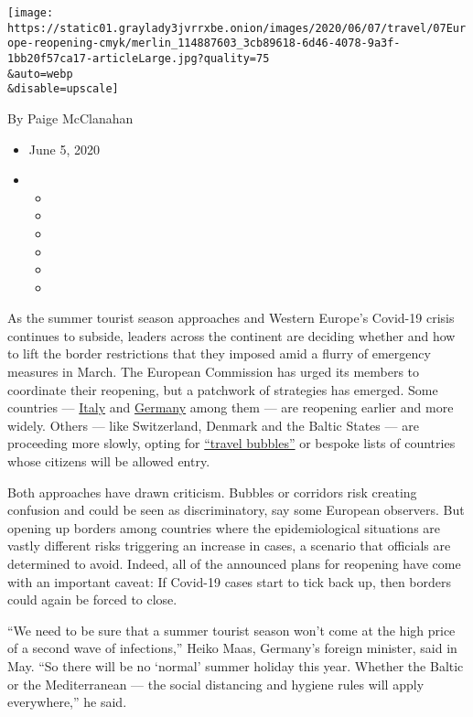 \texttt{[image: https://static01.graylady3jvrrxbe.onion/images/2020/06/07/travel/07Europe-reopening-cmyk/merlin\_114887603\_3cb89618-6d46-4078-9a3f-1bb20f57ca17-articleLarge.jpg?quality=75\\\&auto=webp\\\&disable=upscale]}

By Paige McClanahan

\begin{itemize}
\item
  June 5, 2020
\item
  \begin{itemize}
  \item
  \item
  \item
  \item
  \item
  \item
  \end{itemize}
\end{itemize}

As the summer tourist season approaches and Western Europe's Covid-19
crisis continues to subside, leaders across the continent are deciding
whether and how to lift the border restrictions that they imposed amid a
flurry of emergency measures in March. The European Commission has urged
its members to coordinate their reopening, but a patchwork of strategies
has emerged. Some countries ---
\href{https://www.nytimes3xbfgragh.onion/2020/05/27/world/europe/italy-beaches-coronavirus-reopening.html}{Italy}
and
\href{https://www.nytimes3xbfgragh.onion/2020/05/06/world/europe/germany-merkel-coronavirus-reopening.html}{Germany}
among them --- are reopening earlier and more widely. Others --- like
Switzerland, Denmark and the Baltic States --- are proceeding more
slowly, opting for
\href{https://www.nytimes3xbfgragh.onion/2020/04/29/travel/coronavirus-travel-bubble.html}{``travel
bubbles''} or bespoke lists of countries whose citizens will be allowed
entry.

Both approaches have drawn criticism. Bubbles or corridors risk creating
confusion and could be seen as discriminatory, say some European
observers. But opening up borders among countries where the
epidemiological situations are vastly different risks triggering an
increase in cases, a scenario that officials are determined to avoid.
Indeed, all of the announced plans for reopening have come with an
important caveat: If Covid-19 cases start to tick back up, then borders
could again be forced to close.

``We need to be sure that a summer tourist season won't come at the high
price of a second wave of infections,'' Heiko Maas, Germany's foreign
minister, said in May. ``So there will be no `normal' summer holiday
this year. Whether the Baltic or the Mediterranean --- the social
distancing and hygiene rules will apply everywhere,'' he said.

